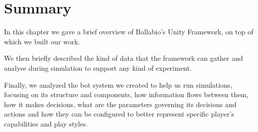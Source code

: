 \section{Summary}
In this chapter we gave a brief overview of Ballabio's Unity Framework, on top of which we built our work.

We then briefly described the kind of data that the framework can gather and analyse during simulation to support any kind of experiment.

Finally, we analyzed the bot system we created to help us run simulations, focusing on its structure and components, how information flows between them, how it makes decisions, what are the parameters governing its decisions and actions and how they can be configured to better represent specific player's capabilities and play styles.